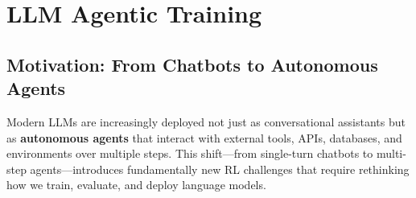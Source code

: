 \chapter{LLM Agentic Training}
\label{llm-agentic-training}

\section{Motivation: From Chatbots to Autonomous Agents}
\label{motivation-from-chatbots-to-autonomous-agents}

Modern LLMs are increasingly deployed not just as conversational assistants but as \textbf{autonomous agents} that interact with external tools, APIs, databases, and environments over multiple steps. This shift---from single-turn chatbots to multi-step agents---introduces fundamentally new RL challenges that require rethinking how we train, evaluate, and deploy language models.

